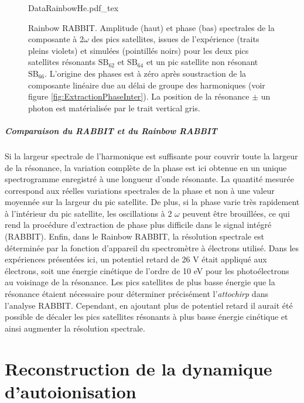 \begin{figure}
\centering
\def\svgwidth{\textwidth}
{DataRainbowHe.pdf_tex}
\caption{Rainbow RABBIT. Amplitude (haut) et phase (bas) spectrales de la composante à 2$\omega$ des pics satellites, issues de l'expérience (traits pleins violets) et simulées (pointillés noirs) pour les deux pics satellites résonants $\text{SB}_{62}$ et $\text{SB}_{64}$ et un pic satellite non résonant $\text{SB}_{66}$. L'origine des phases est à zéro après soustraction de la composante linéaire due au délai de groupe des harmoniques (voir figure \ref{fig:ExtractionPhaseInter}). La position de la résonance $\pm$ un photon est matérialisée par le trait vertical gris.} 
\label{fig:DataRainbowHe}
\end{figure}

\paragraph*{Comparaison du RABBIT et du Rainbow RABBIT} Si la largeur spectrale de l'harmonique est suffisante pour couvrir toute la largeur de la résonance, la variation complète de la phase est ici obtenue en un unique spectrogramme enregistré à une longueur d'onde résonante. La quantité mesurée correspond aux réelles variations spectrales de la phase et non à une valeur moyennée sur la largeur du pic satellite. De plus, si la phase varie très rapidement à l'intérieur du pic satellite, les oscillations à 2 $\omega$ peuvent être brouillées, ce qui rend la procédure d'extraction de phase plus difficile dans le signal intégré (RABBIT). Enfin, dans le Rainbow RABBIT, la résolution spectrale est déterminée par la fonction d'appareil du spectromètre à électrons utilisé. Dans les expériences présentées ici, un potentiel retard de 26 V était appliqué aux électrons, soit une énergie cinétique de l'ordre de 10 eV pour les photoélectrons au voisinage de la résonance. Les pics satellites de plus basse énergie que la résonance étaient nécessaire pour déterminer précisément l'\textit{attochirp} dans l'analyse RABBIT. Cependant, en ajoutant plus de potentiel retard il aurait été possible de décaler les pics satellites résonants à plus basse énergie cinétique et ainsi augmenter la résolution spectrale.

\chapter{Reconstruction de la dynamique d'autoionisation}
\label{chap:HeSaclay_reconstruction}
